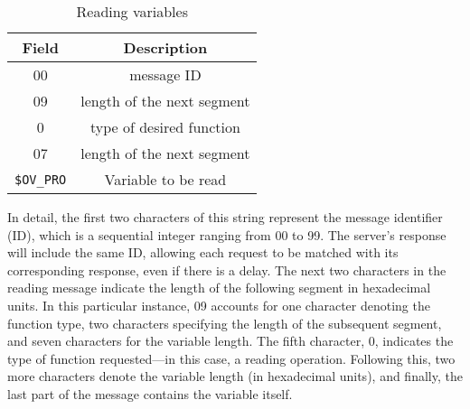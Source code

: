 \begin{table}[h!]
    \centering
    \caption{Reading variables}
    \begin{tabular}{|c|c|}
    \hline
    \textbf{Field} & \textbf{Description} \\ \hline
    00 & message ID \\ \hline
    09 & length of the next segment \\ \hline
    0  & type of desired function \\ \hline
    07 & length of the next segment \\ \hline
    \texttt{\$OV\_PRO} & Variable to be read \\ \hline
    \end{tabular}
    \end{table}
In detail, the first two characters of this string represent the 
message identifier (ID), which is a sequential integer ranging 
from 00 to 99. The server's response will include the same ID, 
allowing each request to be matched with its corresponding response, 
even if there is a delay. The next two characters in the reading message 
indicate the length of the following segment in hexadecimal units. 
In this particular instance, 09 accounts for one character denoting the 
function type, two characters specifying the length of the subsequent 
segment, and seven characters for the variable length. 
The fifth character, 0, indicates the type of function requested—in this 
case, a reading operation. Following this, two more characters denote 
the variable length (in hexadecimal units), and finally, the last part
of the message contains the variable itself.\cite{sanfilippo2014jopenshowvar}
\newpage

